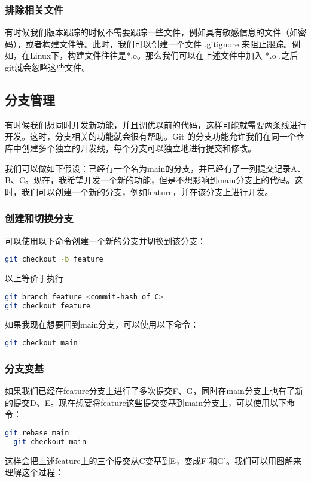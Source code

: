 \subsubsection{排除相关文件}

有时候我们版本跟踪的时候不需要跟踪一些文件，例如具有敏感信息的文件（如密码），或者构建文件等。此时，我们可以创建一个文件 .gitignore 来阻止跟踪。例如，在Linux下，构建文件往往是*.o。那么我们可以在上述文件中加入 *.o ,之后git就会忽略这些文件。

\subsection{分支管理}

有时候我们想同时开发新功能，并且调优以前的代码，这样可能就需要两条线进行开发。这时，分支相关的功能就会很有帮助。Git 的分支功能允许我们在同一个仓库中创建多个独立的开发线，每个分支可以独立地进行提交和修改。

我们可以做如下假设：已经有一个名为main的分支，并已经有了一列提交记录A、B、C。现在，我希望开发一个新的功能，但是不想影响到main分支上的代码。这时，我们可以创建一个新的分支，例如feature，并在该分支上进行开发。

\subsubsection{创建和切换分支}

可以使用以下命令创建一个新的分支并切换到该分支：
\begin{lstlisting}[language=bash]
git checkout -b feature
\end{lstlisting}

以上等价于执行
\begin{lstlisting}[language=bash]
git branch feature <commit-hash of C>
git checkout feature
\end{lstlisting}

如果我现在想要回到main分支，可以使用以下命令：
\begin{lstlisting}[language=bash]
git checkout main
\end{lstlisting}

\subsubsection{分支变基}

如果我们已经在feature分支上进行了多次提交F、G，同时在main分支上也有了新的提交D、E。现在想要将feature这些提交变基到main分支上，可以使用以下命令：
\begin{lstlisting}[language=bash]
  git rebase main
  git checkout main
\end{lstlisting}
这样会把上述feature上的三个提交从C变基到E，变成F'和G'。我们可以用图解来理解这个过程：

